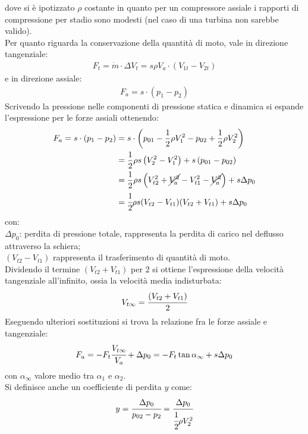 dove si è ipotizzato $\rho$ costante in quanto per un compressore assiale i rapporti di compressione per stadio sono modesti (nel caso di una turbina non sarebbe valido).\\
Per quanto riguarda la conservazione della quantità di moto, vale in direzione tangenziale:
\begin{align*}
F_t= \dot{m} \cdot \Delta V_t = s \rho	V_a \cdot (V_{1t}-V_{2t})
\end{align*}
e in direzione assiale:
\begin{align*}
F_a = s \cdot (p_1 - p_2)
\end{align*}
Scrivendo la pressione nelle componenti di pressione statica e dinamica si espande l'espressione per le forze assiali ottenendo:
\begin{align*}
F_a = s \cdot ( p_1 - p_2) &= s \cdot \left( p_{01} - \frac{1}{2} \rho V_1^2 - p_{02} + \frac{1}{2} \rho V_2^2 \right)\\
&= \frac{1}{2} \rho s \left( V_2^2 - V_1^2 \right) + s \left( p_{01} - p_{02} \right)\\
&= \frac{1}{2} \rho s \left( V_{t2}^2 + \cancel{V_a^2} - V_{t1}^2- \cancel{V_a^2} \right) + s \Delta p_0\\
&=\cfrac{1}{2} \rho s (V_{t2}-V_{t1}) (V_{t2}+V_{t1}) + s \Delta p_0
\end{align*}
con:\\[1mm]
$\Delta p_0$: perdita di pressione totale, rappresenta la perdita di carico nel deflusso attraverso la schiera; \\
$(V_{t2}-V_{t1})$ rappresenta il trasferimento di quantità di moto. \\[2mm]
Dividendo il termine $(V_{t2}+V_{t1})$ per $2$ si ottiene l'espressione della velocità tangenziale all'infinito, ossia la velocità media indisturbata:
\begin{align*}
V_{t \infty}=\cfrac{(V_{t2}+V_{t1})}{2}
\end{align*}
Eseguendo ulteriori sostituzioni si trova la relazione fra le forze assiale e tangenziale:
\begin{align*}
F_a = -F_t \cfrac{V_{t \infty}}{V_a} + \Delta p_0 = - F_t \tan \alpha_{\infty} + s \Delta p_0
\end{align*}
con $\alpha_{\infty}$ valore medio tra $\alpha_1$ e $\alpha_2$.\\
Si definisce anche un coefficiente di perdita $y$ come:
\begin{align*}
y = \cfrac{\Delta p_0}{p_{02}-p_2} = \cfrac{\Delta p_0}{\cfrac{1}{2} \rho V_2^2}
\end{align*}
